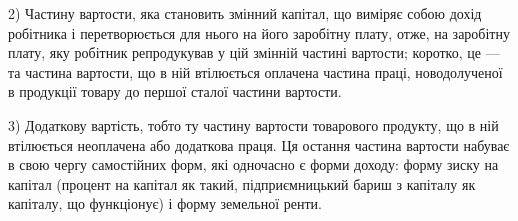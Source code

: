 2) Частину вартости, яка становить змінний капітал, що виміряє собою
дохід робітника і перетворюється для нього на його заробітну плату, отже, на
заробітну плату, яку робітник репродукував у цій змінній частині вартости;
коротко, це — та частина вартости, що в ній втілюється оплачена частина
праці, новодолученої в продукції товару до першої сталої частини вартости.

3) Додаткову вартість, тобто ту частину вартости товарового продукту,
що в ній втілюється неоплачена або додаткова праця. Ця остання частина
вартости набуває в свою чергу самостійних форм, які одночасно є форми
доходу: форму зиску на капітал (процент на капітал як такий, підприємницький
бариш з капіталу як капіталу, що функціонує) і форму земельної ренти.
\parbreak{}  %
